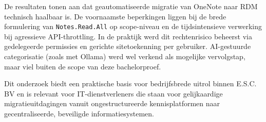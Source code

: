 De resultaten tonen aan dat geautomatiseerde migratie van OneNote naar RDM technisch haalbaar is. De voornaamste beperkingen liggen bij de brede formulering van \texttt{Notes.Read.All} op scope-niveau en de tijdsintensieve verwerking bij agressieve API-throttling. In de praktijk werd dit rechtenrisico beheerst via gedelegeerde permissies en gerichte sitetoekenning per gebruiker. AI-gestuurde categorisatie (zoals met Ollama) werd wel verkend als mogelijke vervolgstap, maar viel buiten de scope van deze bachelorproef.

Dit onderzoek biedt een praktische basis voor bedrijfsbrede uitrol binnen E.S.C. BV en is relevant voor IT-dienstverleners die staan voor gelijkaardige migratieuitdagingen vanuit ongestructureerde kennisplatformen naar gecentraliseerde, beveiligde informatiesystemen.
